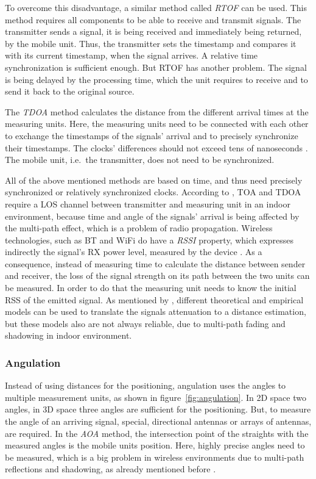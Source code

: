 To overcome this disadvantage, a similar method called \emph{\ac{RTOF}} can be used. This method requires all components to be able to receive and transmit signals. The transmitter sends a signal, it is being received and immediately being returned, by the mobile unit. Thus, the transmitter sets the timestamp and compares it with its current timestamp, when the signal arrives. A relative time synchronization is sufficient enough. But \acs{RTOF} has another problem. The signal is being delayed by the processing time, which the unit requires to receive and to send it back to the original source.

The \emph{\ac{TDOA}} method calculates the distance from the different arrival times at the measuring units. Here, the measuring units need to be connected with each other to exchange the timestamps of the signals' arrival and to precisely synchronize their timestamps. The clocks' differences should not exceed tens of nanoseconds \citep{kotanen:exp_local_pos_bt}. The mobile unit, i.e.\ the transmitter, does not need to be synchronized. 

All of the above mentioned methods are based on time, and thus need precisely synchronized or relatively synchronized clocks. According to \citet{IEEE:survey_wireless_indoor_pos}, \acs{TOA} and \acs{TDOA} require a \acs{LOS} channel between transmitter and measuring unit in an indoor environment, because time and angle of the signals' arrival is being affected by the multi-path effect, which is a problem of radio propagation. Wireless technologies, such as \acl{BT} and WiFi do have a \emph{\ac{RSSI}} property, which expresses indirectly the signal's \ac{RX} power level, measured by the device \citep{kotanen:exp_local_pos_bt}. As a consequence, instead of measuring time to calculate the distance between sender and receiver, the loss of the signal strength on its path between the two units can be measured. In order to do that the measuring unit needs to know the initial \ac{RSS} of the emitted signal. As mentioned by \citet{IEEE:survey_wireless_indoor_pos}, different theoretical and empirical models can be used to translate the signals attenuation to a distance estimation, but these models also are not always reliable, due to multi-path fading and shadowing in indoor environment.

\subsubsection*{Angulation}
Instead of using distances for the positioning, angulation uses the angles to multiple measurement units, as shown in figure~\ref{fig:angulation}. In 2D space two angles, in 3D space three angles are sufficient for the positioning. But, to measure the angle of an arriving signal, special, directional antennas or arrays of antennas, are required. In the \emph{\ac{AOA}} method, the intersection point of the straights with the measured angles is the mobile units position. Here, highly precise angles need to be measured, which is a big problem in wireless environments due to multi-path reflections and shadowing, as already mentioned before \citep{IEEE:survey_wireless_indoor_pos, wang:bt_pos}.

